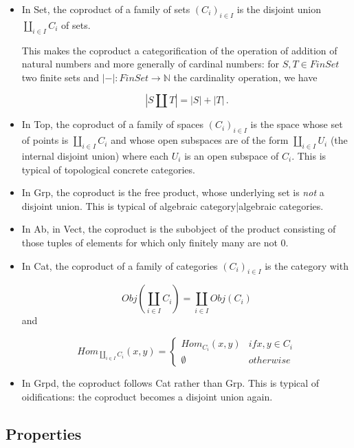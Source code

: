 \documentclass[preprint, 5p, 10pt]{elsarticle}
\theoremstyle{plain}
\begin{document}
\begin{itemize}%
\item In Set, the coproduct of a family of sets $(C_i)_{i\in I}$ is the disjoint union $\coprod_{i\in I} C_i$ of sets.

This makes the coproduct a categorification of the operation of addition of natural numbers and more generally of cardinal numbers: for $S,T \in FinSet$ two finite sets and $|-| : FinSet \to \mathbb{N}$ the cardinality operation, we have

\begin{displaymath}
|S \coprod T| = |S| + |T|
  \,.
\end{displaymath}

\item In Top, the coproduct of a family of spaces $(C_i)_{i\in I}$ is the space whose set of points is $\coprod_{i\in I} C_i$ and whose open subspaces are of the form $\coprod_{i\in I} U_i$ (the internal disjoint union) where each $U_i$ is an open subspace of $C_i$. This is typical of topological concrete categories.


\item In Grp, the coproduct is the free product, whose underlying set is \emph{not} a disjoint union. This is typical of algebraic category|algebraic categories.


\item In Ab, in Vect, the coproduct is the subobject of the product consisting of those tuples of elements for which only finitely many are not 0.


\item In Cat, the coproduct of a family of categories $(C_i)_{i\in I}$ is the category with

\begin{displaymath}
Obj(\coprod_{i\in I} C_i) = \coprod_{i\in I} Obj(C_i)
\end{displaymath}
and

\begin{displaymath}
Hom_{\coprod_{i\in I} C_i}(x,y) = 
  \left\{
    \begin{aligned}
      Hom_{C_i}(x,y) & if x,y \in C_i
      \\
      \emptyset & otherwise
    \end{aligned}
  \right.
\end{displaymath}

\item In Grpd, the coproduct follows Cat rather than Grp. This is typical of oidifications: the coproduct becomes a disjoint union again.



\end{itemize}
\hypertarget{properties_8}{}\subsection*{{Properties}}\label{properties_8}
\end{document}
